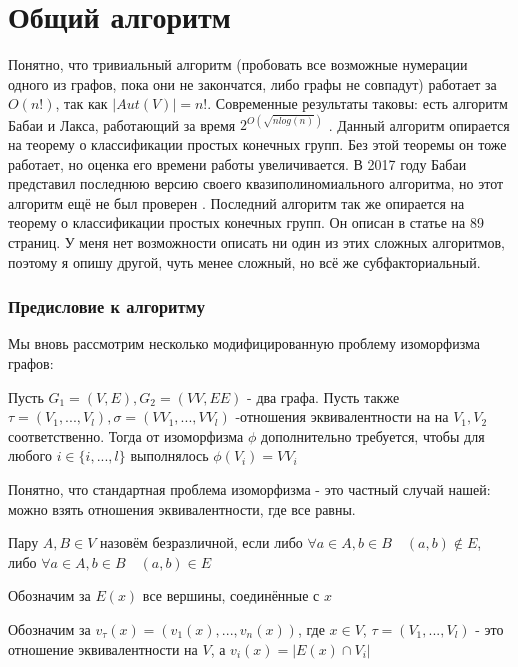 \section{Общий алгоритм}

Понятно, что тривиальный алгоритм (пробовать все возможные нумерации одного из графов, пока они не закончатся, либо графы не совпадут) работает за $O(n!)$, так как $|Aut(V)| = n!$. Современные результаты таковы: есть алгоритм Бабаи и Лакса, работающий за время $2^{O(\sqrt{nlog(n)})}$ \cite{12}. Данный алгоритм опирается на теорему о классификации простых конечных групп. Без этой теоремы он тоже работает, но оценка его времени работы увеличивается. В 2017 году Бабаи представил последнюю версию своего квазиполиномиального алгоритма, но этот алгоритм ещё не был проверен \cite{13}. Последний алгоритм так же опирается на теорему о классификации простых конечных групп. Он описан в статье на 89 страниц. У меня нет возможности описать ни один из этих сложных алгоритмов, поэтому я опишу другой, чуть менее сложный, но всё же субфакториальный.

\subsubsection*{Предисловие к алгоритму}

Мы вновь рассмотрим несколько модифицированную проблему изоморфизма графов:

Пусть $G_1=(V, E), G_2=(VV, EE)$ - два графа. Пусть также $\tau = (V_1, ..., V_l), \sigma = (VV_1, ..., VV_l)$ -отношения эквивалентности на на $V_1, V_2$ соответственно. Тогда от изоморфизма $\phi$ дополнительно требуется, чтобы для любого $i \in \{i, ..., l\}$ выполнялось $\phi(V_i) = VV_i$

Понятно, что стандартная проблема изоморфизма - это частный случай нашей: можно взять отношения эквивалентности, где все равны.

\begin{definition}
    Пару $A, B \in V$ назовём безразличной, если либо $\forall a \in A, b \in B \quad (a, b) \notin E$, либо $\forall a \in A, b \in B \quad (a, b) \in E$
\end{definition}

\begin{definition}
    Обозначим за $E(x)$ все вершины, соединённые с $x$
\end{definition}

\begin{definition}
    Обозначим за $v_{\tau}(x) = (v_1(x), ..., v_n(x))$, где $x \in V$, $\tau = (V_1, ..., V_l)$ - это отношение эквивалентности на $V$, а $v_i(x) = |E(x) \cap V_i|$
\end{definition}

